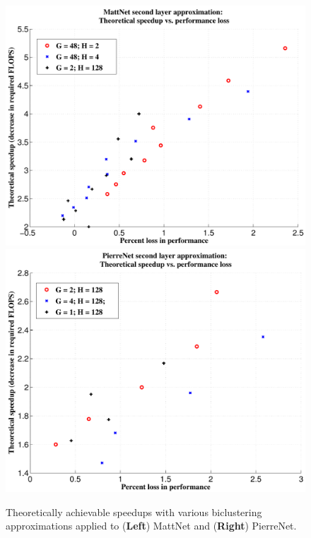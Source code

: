 \begin{figure}[t]
\centering
\begin{minipage}{0.75\textwidth}
  \includegraphics[width=0.5\linewidth]{img/layer2_theoreticalspeedup_vs_performance_loss.pdf} 
  \quad\quad
  \includegraphics[width=0.5\linewidth]{img/layer2_theoreticalspeedup_vs_performance_loss_pierre.pdf} 
\end{minipage}
\caption{Theoretically achievable speedups with various biclustering approximations applied to ({\bf Left}) MattNet and ({\bf Right}) PierreNet.}
\label{fig:biclustering_theory}
\end{figure}

